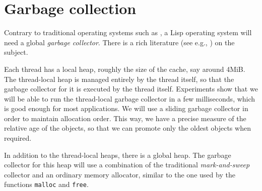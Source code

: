 \chapter{Garbage collection}
\label{chap-garbage-collection}

Contrary to traditional operating systems such as \unix{}, a Lisp
operating system will need a global \emph{garbage collector}.  There 
is a rich literature (see e.g., \cite{Jones:2011:GCH:2025255}) on the
subject. 

Each thread has a local heap, roughly the size of the cache, say
around 4MiB.  The thread-local heap is managed entirely by the thread
itself, so that the garbage collector for it is executed by the thread
itself.  Experiments show that we will be able to run the thread-local
garbage collector in a few milliseconds, which is good enough for most
applications.  We will use a sliding garbage collector in order to
maintain allocation order.  This way, we have a precise measure of the
relative age of the objects, so that we can promote only the oldest
objects when required. 

In addition to the thread-local heaps, there is a global heap.  The
garbage collector for this heap will use a combination of the
traditional \emph{mark-and-sweep} collector and an ordinary memory
allocator, similar to the one used by the \clanguage{} functions
\texttt{malloc} and \texttt{free}.
